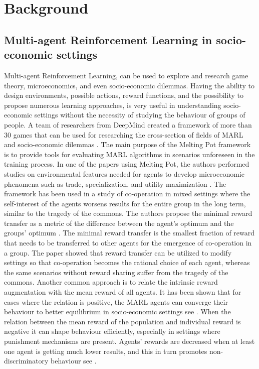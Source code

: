 \documentclass[preprint,12pt,authoryear]{elsarticle}
\begin{document}

\section{Background}

\subsection{Multi-agent Reinforcement Learning in socio-economic settings}

Multi-agent Reinforcement Learning, can be used to explore and research game theory, microeconomics, and even socio-economic dilemmas. Having the ability to design environments, possible actions, reward functions, and the possibility to propose numerous learning approaches, is very useful in understanding socio-economic settings without the necessity of studying the behaviour of groups of people. A team of researchers from DeepMind created a framework of more than 30 games that can be used for researching the cross-section of fields of MARL and socio-economic dilemmas \citep{Leibo2021, agapiou2023meltingpot20}. The main purpose of the Melting Pot framework is to provide tools for evaluating MARL algorithms in scenarios unforeseen in the training process. In one of the papers using Melting Pot, the authors performed studies on environmental features needed for agents to develop microeconomic phenomena such as trade, specialization, and utility maximization  \citep{Johanson2022}. The framework has been used in a study of co-operation in mixed settings where the self-interest of the agents worsens results for the entire group in the long term, similar to the tragedy of the commons. The authors propose the minimal reward transfer as a metric of the difference between the agent’s optimum and the groups’ optimum \citep{Willis2023a, Willis2023b}. The minimal reward transfer is the smallest fraction of reward that needs to be transferred to other agents for the emergence of co-operation in a group. The paper showed that reward transfer can be utilized to modify settings so that co-operation becomes the rational choice of each agent, whereas the same scenarios without reward sharing suffer from the tragedy of the commons. Another common approach is to relate the intrinsic reward augmentation with the mean reward of all agents. It has been shown that for cases where the relation is positive, the MARL agents can converge their behaviour to better equilibrium in socio-economic settings see \citep{Peysakhovich2017}. When the relation between the mean reward of the population and individual reward is negative it can shape behaviour efficiently, especially in settings where punishment mechanisms are present. Agents’ rewards are decreased when at least one agent is getting much lower results, and this in turn promotes non-discriminatory behaviour see \cite{Hughes2018}.
\end{document}
